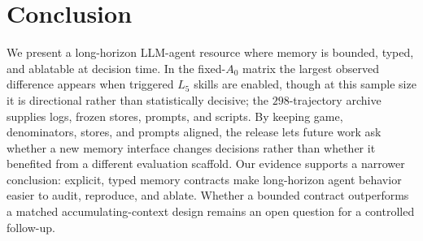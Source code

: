 \section{Conclusion}
\label{sec:conclusion}

We present a long-horizon LLM-agent resource where memory is bounded,
typed, and ablatable at decision time. In the fixed-$A_0$ matrix the
largest observed difference appears when triggered $L_5$ skills are
enabled, though at this sample size it is directional rather than
statistically decisive; the $298$-trajectory archive supplies logs,
frozen stores, prompts, and scripts. By keeping game, denominators,
stores, and prompts aligned, the release lets future work ask whether
a new memory interface changes decisions rather than whether it
benefited from a different evaluation scaffold. Our evidence supports
a narrower conclusion: explicit, typed memory contracts make
long-horizon agent behavior easier to audit, reproduce, and ablate.
Whether a bounded contract outperforms a matched accumulating-context
design remains an open question for a controlled follow-up.
